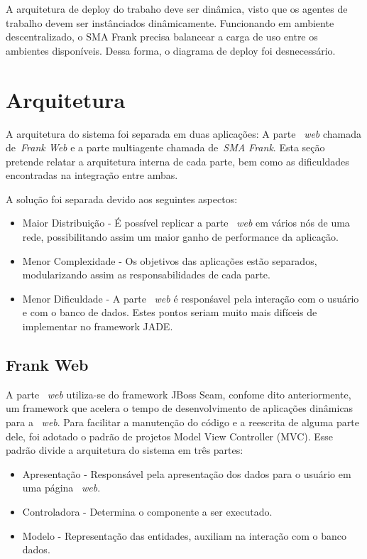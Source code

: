 A arquitetura de deploy do trabaho deve ser dinâmica, visto que os agentes de trabalho devem ser instânciados dinâmicamente. Funcionando em ambiente descentralizado, o SMA Frank precisa balancear a carga de uso entre os ambientes disponíveis. Dessa forma, o diagrama de deploy foi desnecessário.

\section{Arquitetura}

A arquitetura do sistema foi separada em duas aplicações: A parte ~\emph{web} chamada de~\emph{Frank Web} e a parte multiagente chamada de~\emph{SMA Frank}. Esta seção pretende relatar a arquitetura interna de cada parte, bem como as dificuldades encontradas na integração entre ambas.

A solução foi separada devido aos seguintes aspectos:
\begin{itemize}
	\item Maior Distribuição - É possível replicar a parte ~\emph{web} em vários nós de uma rede, possibilitando assim um maior ganho de performance da aplicação.
	\item Menor Complexidade - Os objetivos das aplicações estão separados, modularizando assim as responsabilidades de cada parte.
	\item Menor Dificuldade - A parte ~\emph{web} é responśavel pela interação com o usuário e com o banco de dados. Estes pontos seriam muito mais difíceis de implementar no framework JADE.
\end{itemize}

\subsection{Frank Web}
A parte ~\emph{web} utiliza-se do framework JBoss Seam, confome dito anteriormente, um framework que acelera o tempo de desenvolvimento de aplicações dinâmicas para a ~\emph{web}. Para facilitar a manutenção do código e a reescrita de alguma parte dele, foi adotado o padrão de projetos
Model View Controller (MVC). Esse padrão divide a arquitetura do sistema em três partes:

\begin{itemize}
	\item Apresentação - Responsável pela apresentação dos dados para o usuário em uma página ~\emph{web}.
	\item Controladora - Determina o componente a ser executado.
	\item Modelo - Representação das entidades, auxiliam na interação com o banco dados.
\end{itemize}

